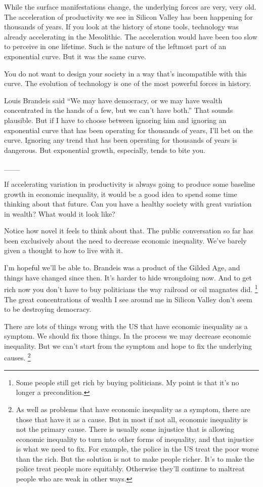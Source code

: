 \documentclass[12pt]{book}
\begin{document}
While the surface manifestations change, the underlying forces are very,
very old. The acceleration of productivity we see in Silicon Valley has
been happening for thousands of years. If you look at the history of
stone tools, technology was already accelerating in the Mesolithic. The
acceleration would have been too slow to perceive in one lifetime. Such
is the nature of the leftmost part of an exponential curve. But it was
the same curve.

You do not want to design your society in a way that's incompatible with
this curve. The evolution of technology is one of the most powerful
forces in history.

Louis Brandeis said ``We may have democracy, or we may have wealth
concentrated in the hands of a few, but we can't have both.'' That
sounds plausible. But if I have to choose between ignoring him and
ignoring an exponential curve that has been operating for thousands of
years, I'll bet on the curve. Ignoring any trend that has been operating
for thousands of years is dangerous. But exponential growth, especially,
tends to bite you.

\_\_\_

If accelerating variation in productivity is always going to produce
some baseline growth in economic inequality, it would be a good idea to
spend some time thinking about that future. Can you have a healthy
society with great variation in wealth? What would it look like?

Notice how novel it feels to think about that. The public conversation
so far has been exclusively about the need to decrease economic
inequality. We've barely given a thought to how to live with it.

I'm hopeful we'll be able to. Brandeis was a product of the Gilded Age,
and things have changed since then. It's harder to hide wrongdoing now.
And to get rich now you don't have to buy politicians the way railroad
or oil magnates did. \footnote{Some people still get rich by buying politicians. My point is
that it's no longer a precondition.} The great concentrations of
wealth I see around me in Silicon Valley don't seem to be destroying
democracy.

There are lots of things wrong with the US that have economic inequality
as a symptom. We should fix those things. In the process we may decrease
economic inequality. But we can't start from the symptom and hope to fix
the underlying causes. \footnote{As well as problems that have economic inequality as a symptom,
there are those that have it as a cause. But in most if not all,
economic inequality is not the primary cause. There is usually some
injustice that is allowing economic inequality to turn into other forms
of inequality, and that injustice is what we need to fix. For example,
the police in the US treat the poor worse than the rich. But the
solution is not to make people richer. It's to make the police treat
people more equitably. Otherwise they'll continue to maltreat people who
are weak in other ways.}
\end{document}
